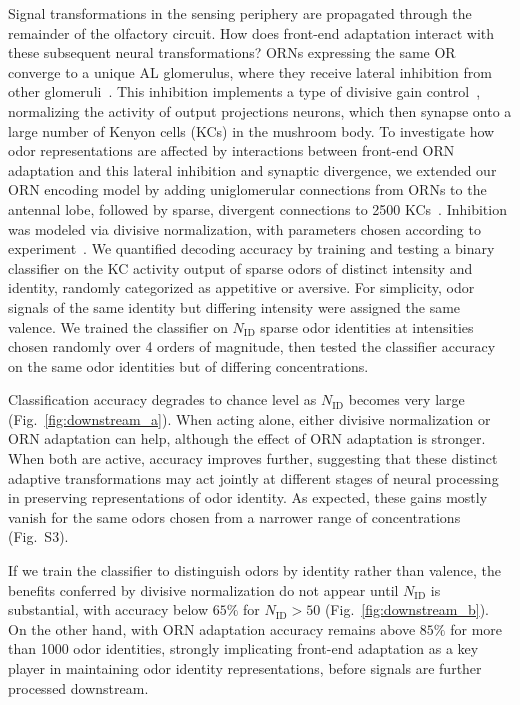 \documentclass[9pt,twocolumn,twoside]{pnas-new}
\begin{document}
Signal transformations in the sensing periphery are propagated through the remainder of the olfactory circuit. How does front-end adaptation interact with these subsequent neural transformations? ORNs expressing the same OR converge to a unique AL glomerulus, where they receive lateral inhibition from other glomeruli~\cite{lateral_inh, lateral_inh_asahina}. This inhibition implements a type of divisive gain control~\cite{divisive_normalization}, normalizing the activity of output projections neurons, which then synapse onto a large number of Kenyon cells (KCs) in the mushroom body. To investigate how odor representations are affected by interactions between front-end ORN adaptation and this lateral inhibition and synaptic divergence, we extended our ORN encoding model by adding uniglomerular connections from ORNs to the antennal lobe, followed by sparse, divergent connections to 2500 KCs~\cite{memory_review, litwinkumar, abbott_axel}. Inhibition was modeled via divisive normalization, with parameters chosen according to experiment~\cite{divisive_normalization}.
We quantified decoding accuracy by training and testing a binary classifier on the KC activity output of sparse odors of distinct intensity and identity, randomly categorized as appetitive or aversive. For simplicity, odor signals of the same identity but differing intensity were assigned the same valence. We trained the classifier on $N_{{\text {ID}}}$ sparse odor identities at intensities chosen randomly over 4 orders of magnitude, then tested the classifier accuracy on the same odor identities but of differing concentrations. 

Classification accuracy degrades to chance level as $N_{\text {ID}}$ becomes very large (Fig.~\ref{fig:downstream_a}). When acting alone, either divisive normalization or ORN adaptation can help, although the effect of ORN adaptation is stronger. When both are active, accuracy improves further, suggesting that these distinct adaptive transformations may act jointly at different stages of neural processing in preserving representations of odor identity. As expected, these gains mostly vanish for the same odors chosen from a narrower range of concentrations (Fig.~S3).

If we train the classifier to distinguish odors by identity rather than valence, the benefits conferred by divisive normalization do not appear until $N_{{\text {ID}}}$ is substantial, with accuracy below $65\%$ for $N_{{\text {ID}}} > 50$ (Fig.~\ref{fig:downstream_b}). On the other hand, with ORN adaptation accuracy remains above $85\%$ for more than 1000 odor identities, strongly implicating front-end adaptation as a key player in maintaining odor identity representations, before signals are further processed downstream. 
\end{document}
